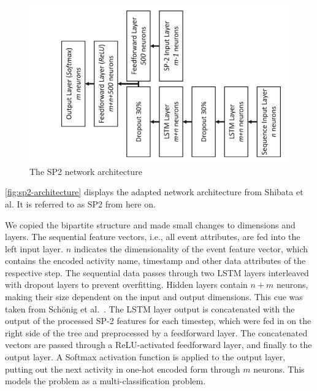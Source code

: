 \begin{figure}[!htb]
    \centering
    \includegraphics[width=.8\textwidth, angle=-90,origin=c]{gfx/sp2-network-architecture.pdf}
    \caption{The SP2 network architecture}
    \label{fig:sp2-architecture}
\end{figure}

\autoref{fig:sp2-architecture} displays the adapted network architecture from Shibata et al. It is referred to as SP2 from here on.

We copied the bipartite structure and made small changes to dimensions and layers.
The sequential feature vectors, i.e., all event attributes, are fed into the left input layer.
$n$ indicates the dimensionality of the event feature vector, which contains the encoded activity name, timestamp and other data attributes of the respective step.
The sequential data passes through two LSTM layers interleaved with dropout layers to prevent overfitting.
Hidden layers contain $n+m$ neurons, making their size dependent on the input and output dimensions.
This cue was taken from Schönig et al.~\cite{schoenig2018}.
The LSTM layer output is concatenated with the output of the processed SP-2 features for each timestep, which were fed in on the right side of the tree and preprocessed by a feedforward layer.
The concatenated vectors are passed through a ReLU-activated feedforward layer, and finally to the output layer.
A Softmax activation function is applied to the output layer, putting out the next activity in one-hot encoded form through $m$ neurons.
This models the problem as a multi-classification problem.

